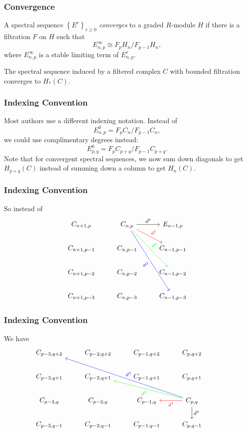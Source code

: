 \documentclass{beamer}
\begin{document}
\begin{frame}
	\frametitle{Convergence}

	\begin{definition}
		A spectral sequence $\left\{ E^{r} \right\}_{r \geq 0}$ \textit{converges} to a graded $R$-module $H$ if there is a filtration $F$ on $H$ such that
		\[
		E^{\infty}_{n,p} \cong F_{p}H_{n}/F_{p-1}H_{n},
		\] 
		where $E^{\infty}_{n,p}$ is a stable limiting term of $E^{r}_{n,p}$.
	\end{definition}

	\begin{theorem}
		The spectral sequence induced by a filtered complex $C$ with bounded filtration converges to $H_{*}(C)$.
	\end{theorem}
\end{frame}


\begin{frame}
	\frametitle{Indexing Convention}

	Most authors use a different indexing notation. Instead of
	\[
	E_{n,p}^{0} = F_{p}C_{n} / F_{p-1}C_{n},
	\] we could use complimentary degrees instead:
	\[
	E_{p,q}^{0} = F_{p}C_{p+q} / F_{p-1}C_{p+q}.
	\] 
	Note that for convergent spectral sequences, we now sum down diagonals to get $H_{p+q}(C)$ instead of summing down a column to get $H_{n}(C)$.
\end{frame}

\begin{frame}[fragile]
	\frametitle{Indexing Convention}

	So instead of
	\[
	\begin{tikzcd}
		C_{n+1,p}&C_{n,p}\rar{d^{0}}\arrow[rd,"d^{1}",red]\arrow[rdd,"d^{2}",green]\arrow[rddd,"d^{3}"',blue]&E_{n-1,p}\\
		C_{n+1,p-1}&C_{n,p-1}&C_{n-1,p-1}\\
		C_{n+1,p-2}&C_{n,p-2}&C_{n-1,p-2}\\
		C_{n+1,p-3}&C_{n,p-3}&C_{n-1,p-3}
	\end{tikzcd}
	\] 
\end{frame}

\begin{frame}[fragile]
	\frametitle{Indexing Convention}

	We have
	\[
	\begin{tikzcd}
		C_{p-3,q+2} & C_{p-2,q+2} & C_{p-1,q+2} & C_{p,q+2} \\
		C_{p-3,q+1} & C_{p-2,q+1} & C_{p-1,q+1} & C_{p,q+1} & \\
		C_{p-3,q} & C_{p-2,q} & C_{p-1,q} & C_{p,q}\dar{d^{0}}\arrow[l,"d^{1}",red]\arrow[llu,"d^{2}",green]\arrow[llluu,"d^{3}"',blue] \\
		C_{p-3,q-1} & C_{p-2,q-1} & C_{p-1,q-1} & C_{p,q-1}
	\end{tikzcd}
	\] 
\end{frame}
\end{document}
